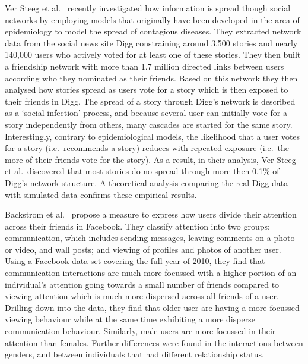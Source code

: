 \documentclass[letterpaper]{article}
\begin{document}
Ver Steeg et al.~\cite{ver2011stops} recently investigated how information is spread though social networks by employing models that originally have been developed in the area of epidemiology to model the spread of contagious diseases. They extracted network data from the social news site Digg constraining around 3,500 stories and nearly 140,000 users who actively voted for at least one of these stories. They then built a friendship network with more than 1.7 million directed links between users according who they nominated as their friends. Based on this network they then analysed how stories spread as users vote for a story which is then exposed to their friends in Digg. The spread of a story through Digg's network is described as a `social infection' process, and because several user can initially vote for a  story independently from others, many cascades are started for the same story. Interestingly, contrary to epidemiological models, the likelihood that a user votes for a story (i.e.\ recommends a story) reduces with repeated exposure (i.e.\ the more of their friends vote for the story). As a result, in their analysis, Ver Steeg et al.\ discovered that most stories do no spread through more then 0.1\% of Digg's network structure. A theoretical analysis comparing the real Digg data with simulated data confirms these empirical results.




Backstrom et al.~\cite{backstrom2011center} propose a measure to express how users divide their attention across their friends in Facebook. They classify attention into two groups: communication, which includes sending messages, leaving comments on a photo or video, and wall posts; and viewing of profiles and photos of another user. Using a Facebook data set covering the full year of 2010, they find that communication interactions are much more focussed with a higher portion of an individual's attention going towards a small number of friends compared to viewing attention which is much more dispersed across all friends of a user. Drilling down into the data, they find that older user are having a more focussed viewing behaviour while at the same time exhibiting a more disperse communication behaviour. Similarly, male users are more focussed in their attention than females. Further differences were found in the interactions between genders, and between individuals that had different relationship status.
\end{document}
